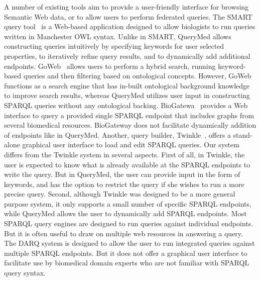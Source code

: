 \documentclass{acm_proc_article-sp}
\begin{document}
A number of existing tools aim to provide a user-friendly interface for browsing Semantic Web data, or to allow users to perform federated queries. The SMART query tool~\cite{Battista} is a Web-based application designed to allow biologists to run queries written in Manchester OWL syntax. Unlike in SMART, QueryMed allows constructing queries intuitively by specifying keywords for user selected properties, to iteratively refine query results, and to dynamically add additional endpoints. GoWeb~\cite{Dietze} allows users to perform a hybrid search, running keyword-based queries and then filtering based on ontological concepts. However, GoWeb functions as a search engine that has in-built ontological background knowledge to improve search results, whereas QueryMed utilizes user input in constructing SPARQL queries without any ontological backing.  BioGatewa~\cite{Antezana} provides a Web interface to query a provided single SPARQL endpoint that includes graphs from several biomedical resources. BioGateway does not facilitate dynamically addition of endpoints like in QueryMed. Another, query builder, Twinkle~\cite{Dodds}, offers a stand-alone graphical user interface to load and edit SPARQL queries. Our system differs from the Twinkle system in several aspects. First of all, in Twinkle, the user is expected to know what is already available at the SPARQL endpoints to write the query. But in QueryMed, the user can provide input in the form of keywords, and has the option to restrict the query if she wishes to run a more precise query. Second, although Twinkle was designed to be a more general purpose system, it only supports a small number of specific SPARQL endpoints, while QueryMed allows the user to dynamically add SPARQL endpoints. Most SPARQL query engines are designed to run queries against individual endpoints. But it is often useful to draw on multiple web resources in answering a query. The DARQ  system \cite{Quilitz} is designed to allow the user to run integrated queries against multiple SPARQL endpoints. But it does not offer a graphical user interface to facilitate use by biomedical domain experts who are not familiar with SPARQL query syntax.
\end{document}

